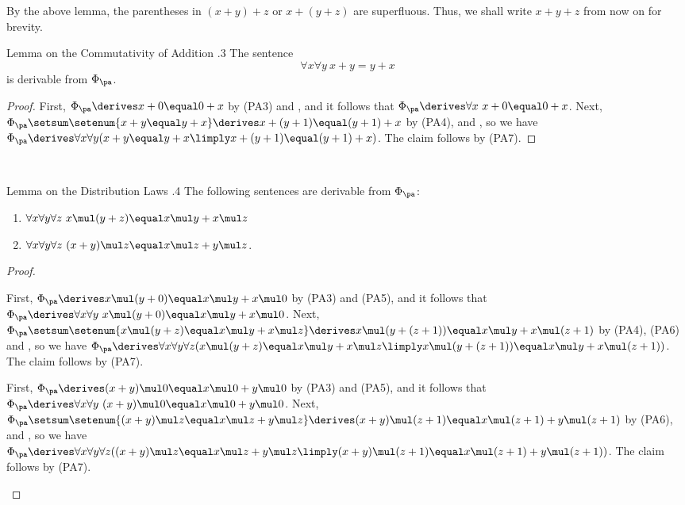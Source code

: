 By the above lemma, the parentheses in $(x + y) + z$ or $x + (y + z)$ are superfluous. Thus, we shall write $x + y + z$ from now on for brevity.\bigskip\\
\begin{theorem}{Lemma on the Commutativity of Addition \thesection.3} The sentence
\[
\forall x \forall y \ x + y \equal y + x
\]
is derivable from $\Phi_\pa$.
\end{theorem}
\begin{proof}
First, $\Phi_\pa \derives x + 0 \equal 0 + x$ by (PA3) and , and it follows that $\Phi_\pa \derives \forall x \ x + 0 \equal 0 + x$. Next, $\Phi_\pa \setsum \setenum{x + y \equal y + x} \derives x + (y + 1) \equal (y + 1) + x$ by (PA4),  and , so we have $\Phi_\pa \derives \forall x \forall y (x + y \equal y + x \limply x + (y + 1) \equal (y + 1) + x)$. The claim follows by (PA7).
\end{proof}\ \medskip\\
\begin{theorem}{Lemma on the Distribution Laws \thesection.4} The following sentences are derivable from $\Phi_\pa$:
\begin{enumerate}[\rm(a)]
%
\item\label{DLR} $\forall x \forall y \forall z \ x \mul (y + z) \equal x \mul y + x \mul z$
%
\item\label{DLL} $\forall x \forall y \forall z \ (x + y) \mul z \equal x \mul z + y \mul z$.
%
\end{enumerate}
\end{theorem}
\begin{proof}
\begin{inparaenum}[(a)]
%
\item First, $\Phi_\pa \derives x \mul (y + 0) \equal x \mul y + x \mul 0$ by (PA3) and (PA5), and it follows that $\Phi_\pa \derives \forall x \forall y \ x \mul (y + 0) \equal x \mul y + x \mul 0$. Next, $\Phi_\pa \setsum \setenum{x \mul (y + z) \equal x \mul y + x \mul z} \derives x \mul (y + (z + 1)) \equal x \mul y + x \mul (z + 1)$ by (PA4), (PA6) and , so we have $\Phi_\pa \derives \forall x \forall y \forall z (x \mul (y + z) \equal x \mul y + x \mul z \limply x \mul (y + (z + 1)) \equal x \mul y + x \mul (z + 1))$. The claim follows by (PA7).\medskip\\
%
\item First, $\Phi_\pa \derives (x + y) \mul 0 \equal x \mul 0 + y \mul 0$ by (PA3) and (PA5), and it follows that $\Phi_\pa \derives \forall x \forall y \ (x + y) \mul 0 \equal x \mul 0 + y \mul 0$. Next, $\Phi_\pa \setsum \setenum{(x + y) \mul z \equal x \mul z + y \mul z} \derives (x + y) \mul (z + 1) \equal x \mul (z + 1) + y \mul (z + 1)$ by (PA6),  and , so we have $\Phi_\pa \derives \forall x \forall y \forall z ((x + y) \mul z \equal x \mul z + y \mul z \limply (x + y) \mul (z + 1) \equal x \mul (z + 1) + y \mul (z + 1))$. The claim follows by (PA7).
\end{inparaenum}
\end{proof}\ \medskip\\
